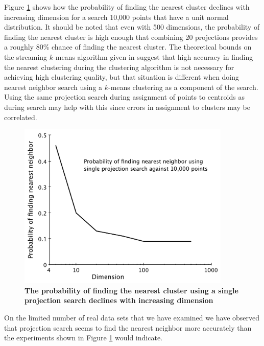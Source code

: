 \documentclass[11pt]{amsart}
\begin{document}
Figure \ref{projection-probability} shows how the probability of finding the nearest cluster declines with increasing dimension for a search 10,000 points that have a unit normal distribution.  It should be noted that even with 500 dimensions, the probability of finding the nearest cluster is high enough that combining 20 projections provides a roughly 80\% chance of finding the nearest cluster.   The theoretical bounds on the streaming $k$-means algorithm given in \cite{DBLP:conf/nips/ShindlerWM11} suggest that high accuracy in finding the nearest clustering during the clustering algorithm is not necessary for achieving high clustering quality, but that situation is different when doing nearest neighbor search using a $k$-means clustering as a component of the search.  Using the same projection search during assignment of points to centroids as during search may help with this since errors in assignment to clusters may be correlated.
\begin{figure}[htbp]
\begin{center}
\includegraphics[width=4in]{projection-probability.pdf}
\caption{{\bf The probability of finding the nearest cluster using a single projection search declines with increasing dimension}}
\label{projection-probability}
\end{center}
\end{figure}
On the limited number of real data sets that we have examined we have observed that projection search seems to find the nearest neighbor more accurately than the experiments shown in Figure \ref{projection-probability} would indicate.
\end{document}
